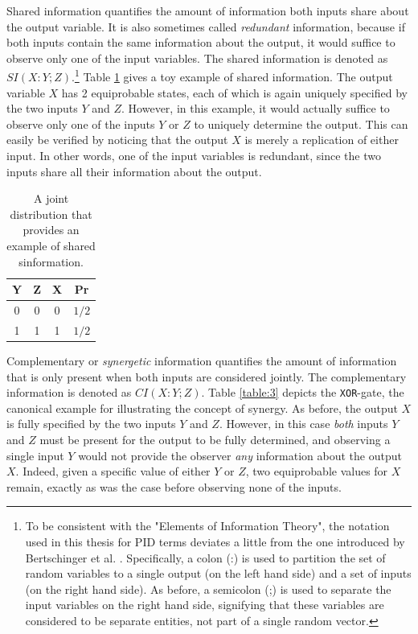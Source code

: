 \documentclass[12pt]{article}
\begin{document}
Shared information quantifies the amount of information both inputs share about the output variable. It is also sometimes called \textit{redundant} information, because if both inputs contain the same information about the output, it would suffice to observe only one of the input variables. The shared information is denoted as $SI(X:Y;Z)$.\footnote{To be consistent with the "Elements of Information Theory", the notation used in this thesis for PID terms deviates a little from the one introduced by Bertschinger et al. \cite{bertschinger}. Specifically, a colon (:) is used to partition the set of random variables to a single output (on the left hand side) and a set of inputs (on the right hand side). As before, a semicolon (;) is used to separate the input variables on the right hand side, signifying that these variables are considered to be separate entities, not part of a single random vector.} Table \ref{table:2} gives a toy example of shared information. The output variable $X$ has 2 equiprobable states, each of which is again uniquely specified by the two inputs $Y$ and $Z$. However, in this example, it would actually suffice to observe only one of the inputs $Y$ or $Z$ to uniquely determine the output. This can easily be verified by noticing that the output $X$ is merely a replication of either input. In other words, one of the input variables is redundant, since the two inputs share all their information about the output.

\begin{table}[h!]
\centering
\caption{A joint distribution that provides an example of shared sinformation.}
\begin{tabular}{|c c |c|c|}
	\hline
	Y & Z & X & Pr\\ 
	\hline
	0 & 0 & 0 & $1/2$\\
	1 & 1 & 1 & $1/2$\\ 
	\hline
\end{tabular}
\label{table:2}
\end{table}

Complementary or \textit{synergetic} information quantifies the amount of information that is only present when both inputs are considered jointly. The complementary information is denoted as $CI(X:Y;Z)$. Table \ref{table:3} depicts the \texttt{XOR}-gate, the canonical example for illustrating the concept of synergy. As before, the output $X$ is fully specified by the two inputs $Y$ and $Z$. However, in this case \textit{both} inputs $Y$ and $Z$ must be present for the output to be fully determined, and observing a single input $Y$ would not provide the observer \textit{any} information about the output $X$. Indeed, given a specific value of either $Y$ or $Z$, two equiprobable values for $X$ remain, exactly as was the case before observing none of the inputs. 
\end{document}

